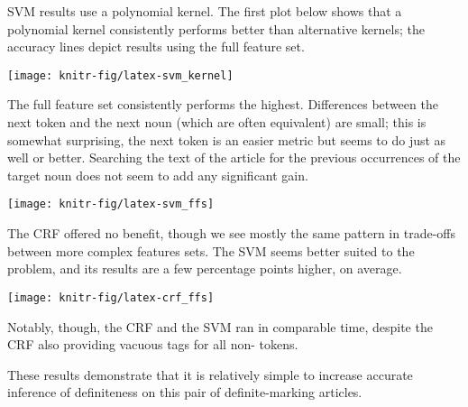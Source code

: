 \documentclass[11pt]{article}\usepackage{graphicx, color}
\newenvironment{knitrout}{}{} %
\begin{document}
SVM results use a polynomial kernel. The first plot below shows that a polynomial kernel consistently performs better than alternative kernels; the accuracy lines depict results using the full feature set.

\begin{knitrout}\small
{}\color{fgcolor}

{\centering \texttt{[image: knitr-fig/latex-svm\_kernel]} 

}



\end{knitrout}


The full feature set consistently performs the highest. Differences between the next token and the next noun (which are often equivalent) are small; this is somewhat surprising, the next token is an easier metric but seems to do just as well or better. Searching the text of the article for the previous occurrences of the target noun does not seem to add any significant gain.

\begin{knitrout}\small
{}\color{fgcolor}

{\centering \texttt{[image: knitr-fig/latex-svm\_ffs]} 

}



\end{knitrout}


The CRF offered no benefit, though we see mostly the same pattern in trade-offs between more complex features sets.
The SVM seems better suited to the problem, and its results are a few percentage points higher, on average.

\begin{knitrout}\small
{}\color{fgcolor}

{\centering \texttt{[image: knitr-fig/latex-crf\_ffs]} 

}



\end{knitrout}


Notably, though, the CRF and the SVM ran in comparable time, despite the CRF also providing vacuous tags for all non-\detplaceholder{} tokens.

These results demonstrate that it is relatively simple to increase accurate inference of definiteness on this pair of definite-marking articles.
\end{document}
